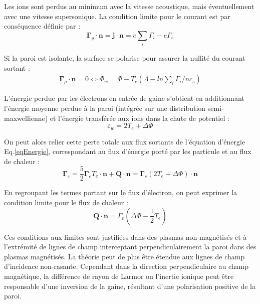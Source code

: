 Les ions sont perdus au minimum avec la vitesse acoustique, mais
éventuellement avec une vitesse supersonique. La condition limite pour le
courant est par conséquence définie par :
\begin{equation}
\boldsymbol{\Gamma}_\rho\cdot\mathbf{n}=\mathbf{j}\cdot\mathbf{n}=e\sum_i{\Gamma}_i-e{\Gamma}_e
\end{equation}

Si la paroi est isolante, la surface se polarise pour assurer la nullité du
courant sortant :
\begin{equation}\begin{split}
\boldsymbol{\Gamma}_\rho\cdot\mathbf{n}=0\Leftrightarrow
\Phi_w=\Phi-T_e(\Lambda-ln\sum_i\Gamma_i/nc_s)
\end{split}\end{equation}

L'énergie perdue par les électrons en entrée de gaine s'obtient en
additionnant l'énergie moyenne perdue à la paroi (intégrée sur une distribution
semi-maxwellienne) et l'énergie transférée aux ions dans la chute de potentiel :
\begin{equation}
	\varepsilon_w=2T_e+\Delta \Phi
\end{equation}
 
 On peut alors relier cette perte totale aux flux sortants de l'équation
 d'énergie Eq.\ref{eqEnergie}, correspondant au flux d'énergie porté par les
 particule et au flux de chaleur :
\begin{equation}
\boldsymbol{\Gamma}_\varepsilon=\frac{5}{2}\boldsymbol{\Gamma}_eT_e\cdot\mathbf{n}+\mathbf{Q}\cdot\mathbf{n}=
\boldsymbol{\Gamma}_e\left(2T_e+\Delta\Phi\right)\cdot\mathbf{n}
\end{equation}

En regroupant les termes portant sur le flux d'électron, on peut exprimer la
condition limite pour le flux de chaleur :
\begin{equation}
\mathbf{Q}\cdot\mathbf{n}=\Gamma_e\left(\Delta\Phi-\frac{1}{2}T_e\right)
\end{equation}

Ces conditions aux limites sont justifiées dans des plasmas
non-magnétisés et à l'extrémité de lignes de champ interceptant
perpendiculairement la paroi dans des plasmas magnétisés. La théorie peut de
plus être étendue aux lignes de champ d'incidence non-rasante. Cependant dans la
direction perpendiculaire au champ magnétique, la différence de rayon de Larmor
ou l'inertie ionique peut être responsable d'une inversion de la gaine,
résultant d'une polarisation positive de la paroi.

